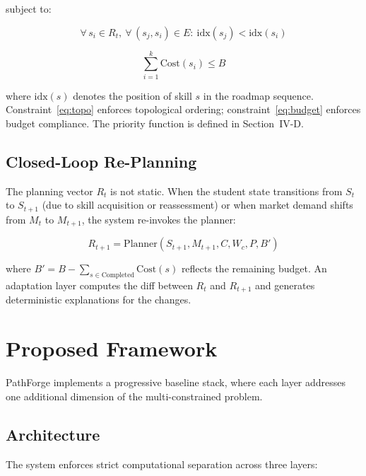 \documentclass[conference]{IEEEtran}
\begin{document}
\noindent subject to:

\begin{equation}
\forall\, s_i \in R_t,\ \forall\, (s_j, s_i) \in E:\ \text{idx}(s_j) < \text{idx}(s_i)
\label{eq:topo}
\end{equation}

\begin{equation}
\sum_{i=1}^{k} \text{Cost}(s_i) \leq B
\label{eq:budget}
\end{equation}

\noindent where $\text{idx}(s)$ denotes the position of skill $s$ in the roadmap sequence. Constraint~\eqref{eq:topo} enforces topological ordering; constraint~\eqref{eq:budget} enforces budget compliance. The priority function is defined in Section~IV-D.

\subsection{Closed-Loop Re-Planning}

The planning vector $R_t$ is not static. When the student state transitions from $S_t$ to $S_{t+1}$ (due to skill acquisition or reassessment) or when market demand shifts from $M_t$ to $M_{t+1}$, the system re-invokes the planner:

\begin{equation}
R_{t+1} = \text{Planner}(S_{t+1}, M_{t+1}, C, W_c, P, B')
\label{eq:replan}
\end{equation}

\noindent where $B' = B - \sum_{s \in \text{Completed}} \text{Cost}(s)$ reflects the remaining budget. An adaptation layer computes the diff between $R_t$ and $R_{t+1}$ and generates deterministic explanations for the changes.

\section{Proposed Framework}

PathForge implements a progressive baseline stack, where each layer addresses one additional dimension of the multi-constrained problem.

\subsection{Architecture}

The system enforces strict computational separation across three layers:
\end{document}
